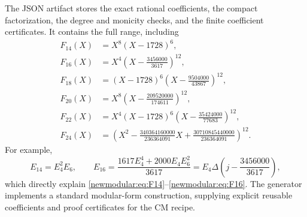 The JSON artifact stores the exact rational coefficients, the compact
factorization, the degree and monicity checks, and the finite
coefficient certificates.  It contains the full range, including
\begin{align}
 F_{14}(X)&=X^8(X-1728)^6,\label{newmodular:eq:F14}\\
 F_{16}(X)&=X^4\left(X-\frac{3456000}{3617}\right)^{12},
 \label{newmodular:eq:F16}\\
 F_{18}(X)&=(X-1728)^6\left(X-\frac{9504000}{43867}\right)^{12},\\
 F_{20}(X)&=X^8\left(X-\frac{209520000}{174611}\right)^{12},\\
 F_{22}(X)&=X^4(X-1728)^6
                  \left(X-\frac{35424000}{77683}\right)^{12},\\
 F_{24}(X)&=\left(X^2-\frac{340364160000}{236364091}X
                         +\frac{30710845440000}{236364091}\right)^{12}.
\end{align}
For example,
\[
 E_{14}=E_4^2E_6,\qquad
 E_{16}=\frac{1617E_4^4+2000E_4E_6^2}{3617}
       =E_4\Delta\left(j-\frac{3456000}{3617}\right),
\]
which directly explain \eqref{newmodular:eq:F14}--\eqref{newmodular:eq:F16}.
The generator implements a standard modular-form construction, supplying
explicit reusable coefficients and proof certificates for the CM recipe.

